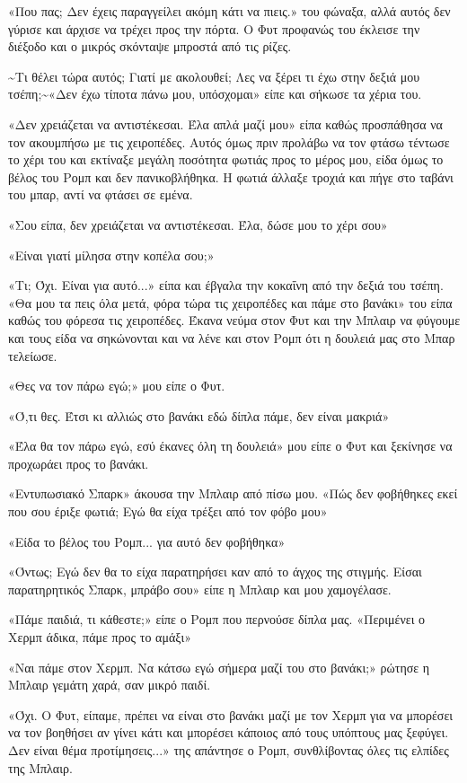\documentclass[12pt,twoside, openany]{book}
\begin{document}
«Που πας; Δεν έχεις παραγγείλει ακόμη κάτι να πιεις.» του φώναξα, αλλά αυτός δεν γύρισε και άρχισε να τρέχει προς την πόρτα. Ο Φυτ προφανώς του έκλεισε την διέξοδο και ο μικρός σκόνταψε μπροστά από τις ρίζες. 

\textasciitilde Τι θέλει τώρα αυτός; Γιατί με ακολουθεί; Λες να ξέρει τι έχω στην δεξιά μου τσέπη;\textasciitilde «Δεν έχω τίποτα πάνω μου, υπόσχομαι» είπε και σήκωσε τα χέρια του.

«Δεν χρειάζεται να αντιστέκεσαι. Έλα απλά μαζί μου» είπα καθώς προσπάθησα να τον ακουμπήσω με τις χειροπέδες. Αυτός όμως πριν προλάβω να τον φτάσω τέντωσε το χέρι του και εκτίναξε μεγάλη ποσότητα φωτιάς προς το μέρος μου, είδα όμως το βέλος του Ρομπ και δεν πανικοβλήθηκα. Η φωτιά άλλαξε τροχιά και πήγε στο ταβάνι του μπαρ, αντί να φτάσει σε εμένα.

«Σου είπα, δεν χρειάζεται να αντιστέκεσαι. Έλα, δώσε μου το χέρι σου»

«Είναι γιατί μίλησα στην κοπέλα σου;»

«Τι; Όχι. Είναι για αυτό...» είπα και έβγαλα την κοκαΐνη από την δεξιά του τσέπη. «Θα μου τα πεις όλα μετά, φόρα τώρα τις χειροπέδες και πάμε στο βανάκι» του είπα καθώς του φόρεσα τις χειροπέδες. Έκανα νεύμα στον Φυτ και την Μπλαιρ να φύγουμε και τους είδα να σηκώνονται και να λένε και στον Ρομπ ότι η δουλειά μας στο Μπαρ τελείωσε.

«Θες να τον πάρω εγώ;» μου είπε ο Φυτ.

«Ό,τι θες. Έτσι κι αλλιώς στο βανάκι εδώ δίπλα πάμε, δεν είναι μακριά»

«Έλα θα τον πάρω εγώ, εσύ έκανες όλη τη δουλειά» μου είπε ο Φυτ και ξεκίνησε να προχωράει προς το βανάκι.

«Εντυπωσιακό Σπαρκ» άκουσα την Μπλαιρ από πίσω μου. «Πώς δεν φοβήθηκες εκεί που σου έριξε φωτιά; Εγώ θα είχα τρέξει από τον φόβο μου»

«Είδα το βέλος του Ρομπ... για αυτό δεν φοβήθηκα»

«Όντως; Εγώ δεν θα το είχα παρατηρήσει καν από το άγχος της στιγμής. Είσαι παρατηρητικός Σπαρκ, μπράβο σου» είπε η Μπλαιρ και μου χαμογέλασε.

«Πάμε παιδιά, τι κάθεστε;» είπε ο Ρομπ που περνούσε δίπλα μας. «Περιμένει ο Χερμπ άδικα, πάμε προς το αμάξι»

«Ναι πάμε στον Χερμπ. Να κάτσω εγώ σήμερα μαζί του στο βανάκι;» ρώτησε η Μπλαιρ γεμάτη χαρά, σαν μικρό παιδί.

«Όχι. Ο Φυτ, είπαμε, πρέπει να είναι στο βανάκι μαζί με τον Χερμπ για να μπορέσει να τον βοηθήσει αν γίνει κάτι και μπορέσει κάποιος από τους υπόπτους μας ξεφύγει. Δεν είναι θέμα προτίμησεις...» της απάντησε ο Ρομπ, συνθλίβοντας όλες τις ελπίδες της Μπλαιρ.
\end{document}
